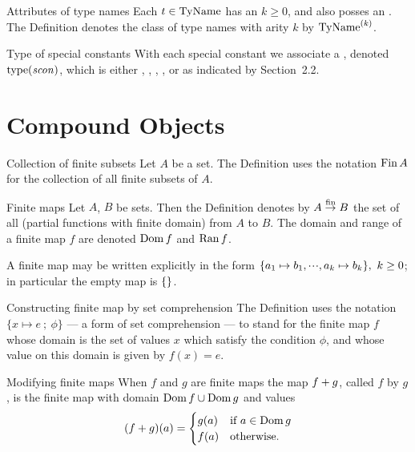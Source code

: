 \begin{definition}{Attributes of type names}
Each $t\in{\rm TyName}$ has an  $k\geq0$, and also posses an
. The Definition denotes the class of type
names with arity $k$ by ${\rm TyName}^{(k)}$.
\end{definition}

\begin{definition}{Type of special constants}\index{$\scontype(\scon)$}
With each special constant {\scon} we associate a
, denoted $\scontype(\scon)$, which is either {\INT}, {\REAL},
{\WORD}, {\CHAR},  or {\STRING} as indicated by Section~2.2.
\end{definition}

\section{Compound Objects}

\begin{definition}{Collection of finite subsets}
Let $A$ be a set. The Definition uses the notation $\mathop{\rm Fin}\nolimits A$ for the
collection of all finite subsets of $A$.
\end{definition}

\begin{definition}{Finite maps}
Let $A$, $B$ be sets. Then the Definition denotes by $A\stackrel{{\rm fin}}{\to}B$ the
set of all  (partial functions with finite domain)
from $A$ to $B$. The domain and range of a finite map $f$ are denoted
$\mathop{\rm Dom}\nolimits f$ and $\mathop{\rm Ran}\nolimits f$.

A finite map may be written explicitly in the form $\{a_1\mapsto b_1,\mbox{$\cdot\!\cdot\!\cdot$},a_k\mapsto b_k\},
\ k\geq 0$;
in particular the empty map is $\{\}$.
\end{definition}

\begin{convention}{Constructing finite map by set comprehension}\label{convention:static-core:finite-map-by-set-comprehesion}
The Definition uses the notation $\{x\mapsto e\ ;\ \phi\}$ --- a form of
set comprehension --- to stand for the finite map $f$ whose domain is
the set of values $x$ which satisfy the condition $\phi$, and whose
value on this domain is given by $f(x)=e$.
\end{convention}

\begin{definition}{Modifying finite maps}\label{defn:static-core:modifying-finite-maps}
When $f$ and $g$ are finite maps the map $f + g$, called
$f$  by $g$, is the finite map with domain
$\mathop{\rm Dom}\nolimits f \cup \mathop{\rm Dom}\nolimits g$ and values
\begin{equation*}
  (f + g)(a) = \begin{cases}g(a) & \mbox{if $a\in\mathop{\rm Dom}\nolimits g$}\\
    f(a) & \mbox{otherwise}.
  \end{cases}
\end{equation*}
\end{definition}

